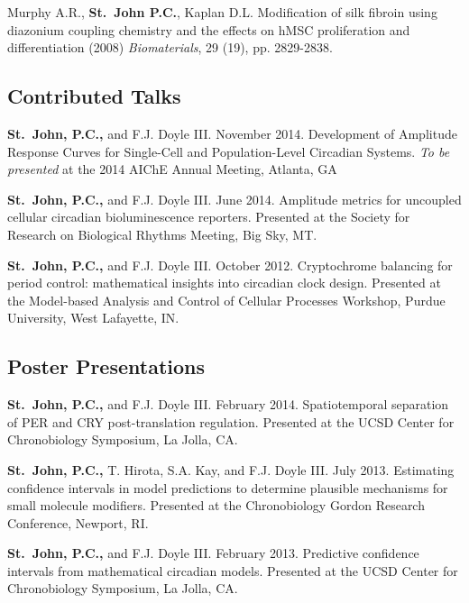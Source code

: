 {Murphy A.R., {\bf St.\ John P.C.}, Kaplan D.L. Modification of silk fibroin using diazonium coupling chemistry and the effects on hMSC proliferation and differentiation (2008) {\em Biomaterials}, 29 (19), pp. 2829-2838.  

\subsection*{Contributed Talks}
{\bfseries St.\ John, P.C.,} and F.J. Doyle III. November 2014. Development of Amplitude Response Curves for Single-Cell and Population-Level Circadian Systems. {\itshape To be presented} at the 2014 AIChE Annual Meeting, Atlanta, GA


{\bfseries St.\ John, P.C.,} and F.J. Doyle III. June 2014. Amplitude metrics for uncoupled cellular circadian bioluminescence reporters. Presented at the Society for Research on Biological Rhythms Meeting, Big Sky, MT.

{\bfseries St.\ John, P.C.,} and F.J. Doyle III. October 2012. Cryptochrome balancing for period control: mathematical insights into circadian clock design. Presented at the Model-based Analysis and Control of Cellular Processes Workshop, Purdue University, West Lafayette, IN.

\subsection*{Poster Presentations}
{\bfseries St.\ John, P.C.,} and F.J. Doyle III. February 2014. Spatiotemporal
separation of PER and CRY post-translation regulation. Presented at the UCSD
Center for Chronobiology Symposium, La Jolla, CA.

{\bfseries St.\ John, P.C.,} T. Hirota, S.A. Kay, and F.J. Doyle III. July 2013. Estimating confidence intervals in model predictions to determine plausible mechanisms for small molecule modifiers. Presented at the Chronobiology Gordon Research Conference, Newport, RI.

{\bfseries St.\ John, P.C.,} and F.J. Doyle III. February 2013. Predictive confidence intervals from mathematical circadian models. Presented at the UCSD Center for Chronobiology Symposium, La Jolla, CA.

}
